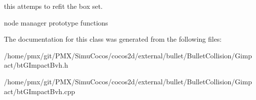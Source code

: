 this attemps to refit the box set. 

node manager prototype functions 

The documentation for this class was generated from the following files\+:\begin{DoxyCompactItemize}
\item 
/home/pmx/git/\+P\+M\+X/\+Simu\+Cocos/cocos2d/external/bullet/\+Bullet\+Collision/\+Gimpact/bt\+G\+Impact\+Bvh.\+h\item 
/home/pmx/git/\+P\+M\+X/\+Simu\+Cocos/cocos2d/external/bullet/\+Bullet\+Collision/\+Gimpact/bt\+G\+Impact\+Bvh.\+cpp\end{DoxyCompactItemize}
